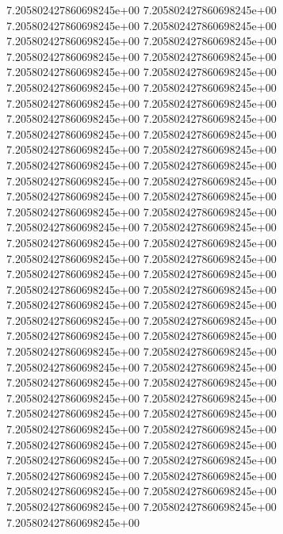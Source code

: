 7.205802427860698245e+00	7.205802427860698245e+00	7.205802427860698245e+00	7.205802427860698245e+00	7.205802427860698245e+00	7.205802427860698245e+00	7.205802427860698245e+00	7.205802427860698245e+00	7.205802427860698245e+00	7.205802427860698245e+00	7.205802427860698245e+00	7.205802427860698245e+00	7.205802427860698245e+00	7.205802427860698245e+00	7.205802427860698245e+00	7.205802427860698245e+00	7.205802427860698245e+00	7.205802427860698245e+00	7.205802427860698245e+00	7.205802427860698245e+00	7.205802427860698245e+00	7.205802427860698245e+00	7.205802427860698245e+00	7.205802427860698245e+00	7.205802427860698245e+00	7.205802427860698245e+00	7.205802427860698245e+00	7.205802427860698245e+00	7.205802427860698245e+00	7.205802427860698245e+00	7.205802427860698245e+00	7.205802427860698245e+00	7.205802427860698245e+00	7.205802427860698245e+00	7.205802427860698245e+00	7.205802427860698245e+00	7.205802427860698245e+00	7.205802427860698245e+00	7.205802427860698245e+00	7.205802427860698245e+00	7.205802427860698245e+00	7.205802427860698245e+00	7.205802427860698245e+00	7.205802427860698245e+00	7.205802427860698245e+00	7.205802427860698245e+00	7.205802427860698245e+00	7.205802427860698245e+00	7.205802427860698245e+00	7.205802427860698245e+00	7.205802427860698245e+00	7.205802427860698245e+00	7.205802427860698245e+00	7.205802427860698245e+00	7.205802427860698245e+00	7.205802427860698245e+00	7.205802427860698245e+00	7.205802427860698245e+00	7.205802427860698245e+00	7.205802427860698245e+00	7.205802427860698245e+00	7.205802427860698245e+00	7.205802427860698245e+00	7.205802427860698245e+00	7.205802427860698245e+00	7.205802427860698245e+00	7.205802427860698245e+00
